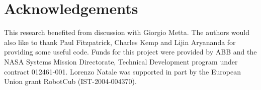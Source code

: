 \section*{Acknowledgements}
This research benefited from discussion with Giorgio Metta. The
authors would also like to thank Paul Fitzpatrick, Charles Kemp
and Lijin Aryananda for providing some useful code. Funds for this
project were provided by ABB and the NASA Systems Mission
Directorate, Technical Development program under contract
012461-001. Lorenzo Natale was supported in part by the European
Union grant RobotCub (IST-2004-004370).
